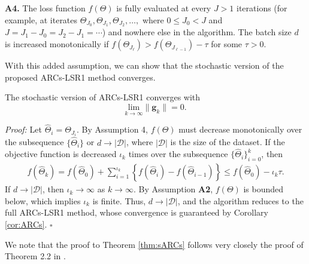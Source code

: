 \medskip

\noindent
\textbf{A4.} The loss function $f(\Theta)$ is fully evaluated at every $J > 1$ iterations (for example, 
at iterates $\Theta_{J_0}, \Theta_{J_1}, \Theta_{J_2}, \dots,$ where $0 \le J_0 < J$ and
$J = J_1 - J_0 = J_2 - J_1 = \cdots $) and nowhere else in the algorithm.  The batch size $d$ is increased 
monotonically if $f(\Theta_{J_{\ell}}) > f(\Theta_{J_{\ell - 1}}) - \tau$ for some $\tau > 0$.

\medskip

\noindent 
With this added assumption, we can show that the stochastic version of the proposed ARCs-LSR1 method converges.

\begin{theorem}\label{thm:sARCs}
	The stochastic version of ARCs-LSR1 converges with  
	$$\underset{k \to \infty}{\text{lim}} \|\mathbf{g}_k\| = 0.$$
\end{theorem}

\textit{Proof:} Let $\widehat{\Theta}_i = \Theta_{J_i}$.  By Assumption 4, $f(\Theta)$ must 
decrease monotonically over the subsequence $\{ \widehat{\Theta}_i \}$ or $d \rightarrow |\mathcal{D}|$,
where $|\mathcal{D}|$ is the size of the dataset.    If the objective function is decreased 
$\iota_k$ times over the subsequence $ \{ \widehat{\Theta}_i\}_{i=0}^k$, then
\begin{eqnarray*}
	f(\widehat{\Theta}_k) = f(\hat{\Theta}_0)  + \sum_{i=1}^{\iota_k}
	\left \{
		f(\widehat{\Theta}_i)  -  f(\widehat{\Theta}_{i-1})
	\right \} \le  f(\widehat{\Theta}_0) - \iota_k \tau.
\end{eqnarray*}
If $d \rightarrow |\mathcal{D}|$, then $\iota_k \rightarrow \infty$ as $k \rightarrow \infty$.
By Assumption \textbf{A2}, $f(\Theta)$ is bounded below, which implies $\iota_k$ is finite.  
Thus, $d \rightarrow |\mathcal{D}|$, and the algorithm reduces to the full ARCs-LSR1 method,
whose convergence is guaranteed by Corollary \ref{cor:ARCs}.  $\square$

\medskip

\noindent 
We note that the proof to Theorem \ref{thm:sARCs} follows very closely the proof of Theorem 2.2 in 
\citet{Erway2020TrustregionAF}.


